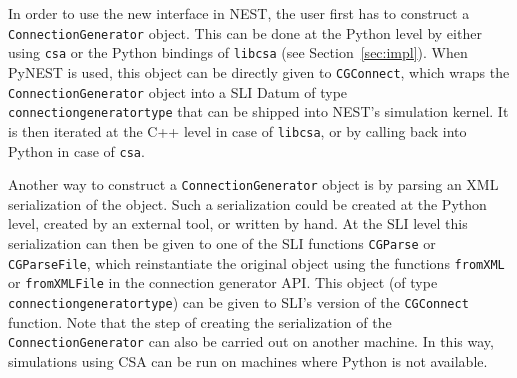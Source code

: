 \documentclass{frontiersSCNS} %
\begin{document}
In order to use the new interface in NEST, the user first has to
construct a \verb|ConnectionGenerator| object.
This can be done at the Python level by either using
\verb|csa| or the Python bindings of \verb|libcsa| (see
Section~\ref{sec:impl}). When PyNEST is used, this object can be directly
given to \verb|CGConnect|, which wraps the
\verb|ConnectionGenerator| object into a SLI Datum of type
\verb|connectiongeneratortype| that can be shipped into NEST's
simulation kernel. It is then iterated at the C++ level in case of
\verb|libcsa|, or by calling back into Python in case of \verb|csa|.

Another way to construct a \verb|ConnectionGenerator| object is by
parsing an XML serialization of the object. Such a serialization could
be created at the Python level, created by an external tool, or
written by hand.  At the SLI level
this serialization can then be given to one of the
SLI functions \verb|CGParse| or \verb|CGParseFile|, which
reinstantiate the original object using the functions \verb|fromXML| or
\verb|fromXMLFile| in the connection generator API. This object (of type
\verb|connectiongeneratortype|) can be given to SLI's version of the
\verb|CGConnect| function. Note that the step of creating the
serialization of the \verb|ConnectionGenerator| can also be carried
out on another machine. In this way, simulations using CSA can be run
on machines where Python is not available.
\end{document}
